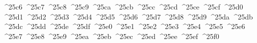 {  ^^^^25c6%
  ^^^^25c7%
  ^^^^25c8%
  ^^^^25c9%
  ^^^^25ca%
  ^^^^25cb%
  ^^^^25cc%
  ^^^^25cd%
  ^^^^25ce%
  ^^^^25cf%
  ^^^^25d0%
  ^^^^25d1%
  ^^^^25d2%
  ^^^^25d3%
  ^^^^25d4%
  ^^^^25d5%
  ^^^^25d6%
  ^^^^25d7%
  ^^^^25d8%
  ^^^^25d9%
  ^^^^25da%
  ^^^^25db%
  ^^^^25dc%
  ^^^^25dd%
  ^^^^25de%
  ^^^^25df%
  ^^^^25e0%
  ^^^^25e1%
  ^^^^25e2%
  ^^^^25e3%
  ^^^^25e4%
  ^^^^25e5%
  ^^^^25e6%
  ^^^^25e7%
  ^^^^25e8%
  ^^^^25e9%
  ^^^^25ea%
  ^^^^25eb%
  ^^^^25ec%
  ^^^^25ed%
  ^^^^25ee%
  ^^^^25ef%
  ^^^^25f0%
}
